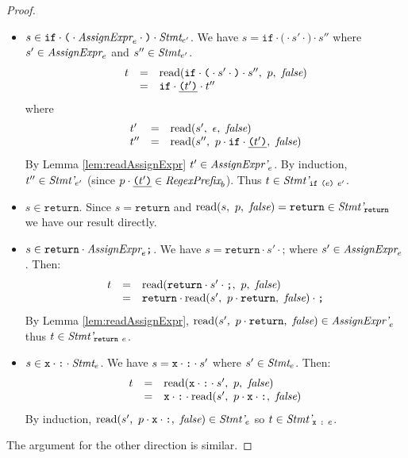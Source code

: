\documentclass[preprint,10pt]{sigplanconf}
\begin{document}
\begin{proof}
\begin{itemize}
  \item \( s \in \texttt{if} \cdot \texttt{(} \cdot \textit{AssignExpr}_{e}
    \cdot \texttt{)} \cdot \textit{Stmt}_{e'}  \). We have \( s =
    \texttt{if}\cdot \texttt{(}\cdot s' \cdot \texttt{)} \cdot s'' \) where \( s' \in
    \textit{AssignExpr}_{e} \) and \( s'' \in \textit{Stmt}_{e'} \).
    \[
    \begin{array}{rcl}
      t &=& \textrm{read}(
        \texttt{if}\cdot \texttt{(} \cdot s' \cdot \texttt{)} \cdot s'' 
      ,~p,~\textit{false})
      \\
      &=& \texttt{if} \cdot \underline{ \texttt{(} t' \texttt{)}} \cdot t'' 
    \end{array}
    \]
    where 
    \[ 
    \begin{array}{lcl}
      t' &=& \textrm{read}(s',~\epsilon,~\textit{false})
      \\
      t'' &=& \textrm{read}(s'',~
        p \cdot \texttt{if} \cdot \underline{ \texttt{(} t' \texttt{)}}
      ,~\textit{false})
    \end{array}
    \]
    By Lemma \ref{lem:readAssignExpr} \( t' \in
    \textit{AssignExpr'}_{e} \). By induction, 
    \( t'' \in \textit{Stmt'}_{e'} \) (since
    \( p \cdot \underline{ \texttt{(} t' \texttt{)}} \in \textit{RegexPrefix}_b \)). Thus \( t \in
    \textit{Stmt'}_{\texttt{if}~\texttt{(} e \texttt{)}~e'} \).

  \item \( s \in \texttt{return} \). Since \( s = \texttt{return} \)
    and \( \textrm{read}(s,~p,~\textit{false}) = \texttt{return} \in
    \textit{Stmt'}_{\texttt{return}} \) we have our result directly.

  \item \( s \in \texttt{return} \cdot \textit{AssignExpr}_{e} \texttt{;} \).
    We have \( s = \texttt{return}\cdot s' \cdot \texttt{;} \) where
    \( s' \in \textit{AssignExpr}_{e} \). Then:
    \[
    \begin{array}{rcl}
      t &=& \textrm{read}(\texttt{return} \cdot s' \cdot \texttt{;},~p,~\textit{false})
      \\
      &=& \texttt{return}\cdot \textrm{read}(s',~p \cdot \texttt{return},~\textit{false})
      \cdot \texttt{;}
    \end{array}
    \]
    By Lemma \ref{lem:readAssignExpr}, \( \textrm{read}(s',~p
      \cdot \texttt{return},~\textit{false}) \in \textit{AssignExpr'}_{e}
    \) thus \( t \in \textit{Stmt'}_{\texttt{return}~e} \).

  \item \( s \in \texttt{x} \cdot \texttt{:} \cdot \textit{Stmt}_{e} \). We have \( s =
    \texttt{x} \cdot \texttt{:} \cdot s' \) where \( s' \in \textit{Stmt}_{e}
    \). Then:
    \[
    \begin{array}{rcl}
      t &=& \textrm{read}(\texttt{x} \cdot \texttt{:} \cdot s',~p,~\textit{false})
      \\
      &=& \texttt{x} \cdot \texttt{:} \cdot 
      \textrm{read}(s',~
        p \cdot \texttt{x} \cdot \texttt{:}
      ,~\textit{false})
    \end{array}
    \]
    By induction, \( \textrm{read}(s',~p \cdot \texttt{x} \cdot
      \texttt{:},~\textit{false}) \in \textit{Stmt'}_{e} \) so \( t \in
    \textit{Stmt'}_{\texttt{x}~\texttt{:}~e} \).
  \end{itemize}

  The argument for the other direction is similar.
\end{proof}
\end{document}
